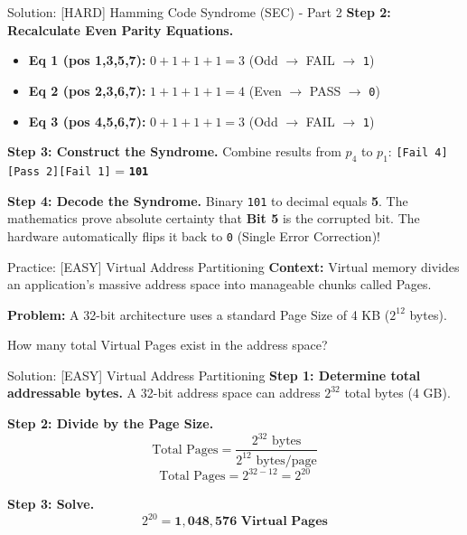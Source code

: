 \documentclass[aspectratio=169]{beamer}
\begin{document}
\begin{frame}{Solution: [HARD] Hamming Code Syndrome (SEC) - Part 2}
\textbf{Step 2: Recalculate Even Parity Equations.}
\begin{itemize}
    \item \textbf{Eq 1 (pos 1,3,5,7):} $0+1+1+1 = 3$ (Odd $\rightarrow$ FAIL $\rightarrow$ \texttt{1})
    \item \textbf{Eq 2 (pos 2,3,6,7):} $1+1+1+1 = 4$ (Even $\rightarrow$ PASS $\rightarrow$ \texttt{0})
    \item \textbf{Eq 3 (pos 4,5,6,7):} $0+1+1+1 = 3$ (Odd $\rightarrow$ FAIL $\rightarrow$ \texttt{1})
\end{itemize}

\vspace{0.5cm}
\textbf{Step 3: Construct the Syndrome.}
Combine results from $p_4$ to $p_1$: \texttt{[Fail 4][Pass 2][Fail 1]} = \textbf{\texttt{101}}

\vspace{0.5cm}
\textbf{Step 4: Decode the Syndrome.}
Binary \texttt{101} to decimal equals \textbf{5}. The mathematics prove absolute certainty that \textbf{Bit 5} is the corrupted bit. The hardware automatically flips it back to \texttt{0} (Single Error Correction)!
\end{frame}

\begin{frame}{Practice: [EASY] Virtual Address Partitioning}
\textbf{Context:} Virtual memory divides an application's massive address space into manageable chunks called Pages.

\vspace{0.5cm}
\textbf{Problem:} 
A 32-bit architecture uses a standard Page Size of 4 KB ($2^{12}$ bytes). 

How many total Virtual Pages exist in the address space?
\end{frame}

\begin{frame}{Solution: [EASY] Virtual Address Partitioning}
\textbf{Step 1: Determine total addressable bytes.}
A 32-bit address space can address $2^{32}$ total bytes (4 GB).

\vspace{0.5cm}
\textbf{Step 2: Divide by the Page Size.}
\[ \text{Total Pages} = \frac{2^{32} \text{ bytes}}{2^{12} \text{ bytes/page}} \]
\[ \text{Total Pages} = 2^{32 - 12} = 2^{20} \]

\vspace{0.5cm}
\textbf{Step 3: Solve.}
\[ 2^{20} = \mathbf{1,048,576 \text{ Virtual Pages}} \]
\end{frame}
\end{document}
